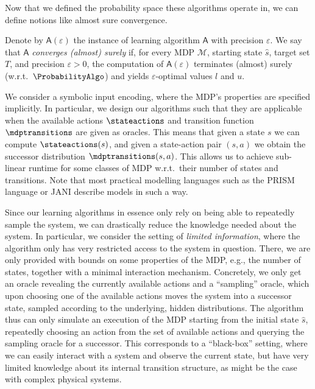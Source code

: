 \documentclass{theoretics}
\newcommand{\MDP}{\mathcal{M}}
\newcommand{\initialstate}{\hat{s}}
\newcommand{\learningalgo}{\mathsf{A}}
\begin{document}
Now that we defined the probability space these algorithms operate in, we can define notions like almost sure convergence.
\begin{definition}
	Denote by $\learningalgo(\varepsilon)$ the instance of learning algorithm $\learningalgo$ with precision $\varepsilon$.
	We say that $\learningalgo$ \emph{converges (almost) surely} if, for every MDP $\MDP$, starting state $\initialstate$, target set $T$, and precision $\varepsilon > 0$, the computation of $\learningalgo(\varepsilon)$ terminates (almost) surely (w.r.t.\ $\ProbabilityAlgo$) and yields $\varepsilon$-optimal values $l$ and $u$.
\end{definition}
We consider a symbolic input encoding, where the MDP's properties are specified implicitly.
In particular, we design our algorithms such that they are applicable when the available actions $\stateactions$ and transition function $\mdptransitions$ are given as oracles.
This means that given a state $s$ we can compute $\stateactions(s)$, and given a state-action pair $(s, a)$ we obtain the successor distribution $\mdptransitions(s, a)$.
This allows us to achieve sub-linear runtime for some classes of MDP w.r.t.\ their number of states and transitions.
Note that most practical modelling languages such as the PRISM language \cite{DBLP:conf/cav/KwiatkowskaNP11} or JANI \cite{DBLP:conf/tacas/BuddeDHHJT17} describe models in such a way.

Since our learning algorithms in essence only rely on being able to repeatedly sample the system, we can drastically reduce the knowledge needed about the system.
In particular, we consider the setting of \emph{limited information}, where the algorithm only has very restricted access to the system in question.
There, we are only provided with bounds on some properties of the MDP, e.g., the number of states, together with a minimal interaction mechanism.
Concretely, we only get an oracle revealing the currently available actions and a \enquote{sampling} oracle, which upon choosing one of the available actions moves the system into a successor state, sampled according to the underlying, hidden distributions.
The algorithm thus can only simulate an execution of the MDP starting from the initial state $\initialstate$, repeatedly choosing an action from the set of available actions and querying the sampling oracle for a successor.
This corresponds to a \enquote{black-box} setting, where we can easily interact with a system and observe the current state, but have very limited knowledge about its internal transition structure, as might be the case with complex physical systems.
\end{document}
